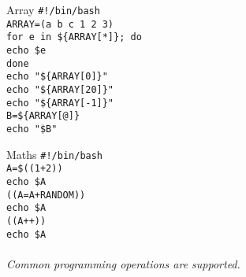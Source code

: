 \documentclass{beamer}
\let\tt\texttt
\let\it\itshape
\begin{document}
\begin{frame}{Array}
        \tt{\#!/bin/bash}                       \\
        \tt{ARRAY=(a b c 1 2 3)}                \\
        \tt{for e in \$\{ARRAY[*]\}; do}     \\
        \quad \tt{echo \$e}                     \\
        \tt{done}                               \\
        \tt{echo "\$\{ARRAY[0]\}"}              \\
        \tt{echo "\$\{ARRAY[20]\}"}             \\
        \tt{echo "\$\{ARRAY[-1]\}"}             \\
        \tt{B=\$\{ARRAY[@]\}}                   \\
        \tt{echo "\$B"}
\end{frame}


\begin{frame}{Maths}
        \tt{\#!/bin/bash}                       \\
        \tt{A=\$((1+2))}                        \\
        \tt{echo \$A}                           \\
        \tt{((A=A+RANDOM))}                     \\
        \tt{echo \$A}                           \\
        \tt{((A++))}                            \\
        \tt{echo \$A}                           \\
        \quad                                   \\
        {\it Common programming operations are supported.} \\
\end{frame}
\end{document}
